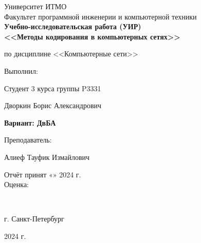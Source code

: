 \begin{center}
	\vspace{1cm}
	\large{Университет ИТМО}\\
	\large{Факультет программной инженерии и компьютерной техники}\\
	\vspace{4cm}
	\Large{\textbf{Учебно-исследовательская работа (УИР)\\}}
	\vspace{0.3cm}
	\large{\textbf{<<Методы кодирования в компьютерных сетях>>\\}}
	\vspace{-0.3cm}
	\begin{center}
		\large{по дисциплине <<Компьютерные сети>>}
	\end{center}
	\vspace{3cm}
\end{center}
\normalsize{
	\begin{flushright}
		Выполнил:
		\par
		Студент 3 курса группы P3331
		\par
		Дворкин Борис Александрович
		\par
		\textbf{Вариант: ДвБА}
		\par
		\vspace{1cm}
		Преподаватель:
		\par
		Алиеф Тауфик Измайлович
		\par
		\noindent Отчёт принят «\underline{\hspace{0.7cm}}» \underline{\hspace{1.3cm}} 2024 г.\\
		Оценка: \underline{\hspace{2cm}}
	\end{flushright}
}\\
\vspace{6cm}
\begin{center} г. Санкт-Петербург
	\par
	2024 г.
\end{center}
\thispagestyle{empty}
\thispagestyle{empty}
